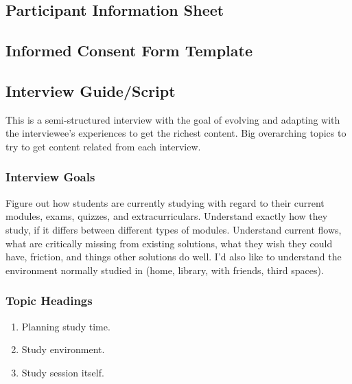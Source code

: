 \documentclass[a4paper,11pt]{article}
\begin{document}
\subsection{Participant Information Sheet}



\subsection{Informed Consent Form Template}


\newpage
\subsection{Interview Guide/Script}
This is a semi-structured interview with the goal of evolving and adapting with the interviewee's experiences to get the richest content.
Big overarching topics to try to get content related from each interview.
\subsubsection*{Interview Goals}
Figure out how students are currently studying with regard to their current modules, exams, quizzes, and extracurriculars.
Understand exactly how they study, if it differs between different types of modules. Understand current 
flows, what are critically missing from existing solutions, what they wish they could have, friction, and things other solutions do well.
I'd also like to understand the environment normally studied in (home, library, with friends, third spaces).


\subsubsection*{Topic Headings}
\begin{enumerate}
    \item Planning study time.
    \item Study environment.
    \item Study session itself.
\end{enumerate}
\end{document}
